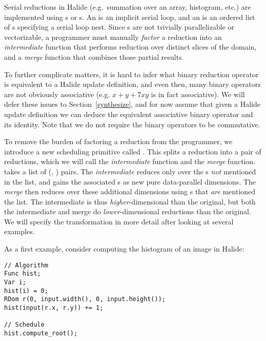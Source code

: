 
Serial reductions in Halide (e.g.\ summation over an array, histogram, etc.) are implemented using s or s. An  is an implicit serial loop, and an  is an ordered list of s specifying a serial loop nest. Since s are not trivially parallelizable or vectorizable, a programmer must manually \emph{factor} a reduction into an \emph{intermediate} function that performs reduction over distinct slices of the domain, and a \emph{merge} function that combines those partial results.

To further complicate matters, it is hard to infer what binary reduction operator is equivalent to a Halide update definition, and even then, many binary operators are not obviously associative (e.g. $x + y + 7xy$ is in fact associative). We will defer these issues to Section~\ref{synthesize}, and for now assume that given a Halide update definition we can deduce the equivalent associative binary operator and its identity. Note that we do not require the binary operators to be commutative.

To remove the burden of factoring a reduction from the programmer, we introduce a new scheduling primitive called . This splits a reduction into a pair of reductions, which we will call the \emph{intermediate} function and the \emph{merge} function.  takes a list of (, ) pairs. The \emph{intermediate} reduces only over the s \emph{not} mentioned in the list, and gains the associated s as new pure data-parallel dimensions. The \emph{merge} then reduces over these additional dimensions using s that \emph{are} mentioned the list. The intermediate is thus \emph{higher}-dimensional than the original, but both the intermediate and merge do \emph{lower}-dimensional reductions than the original. We will specify the transformation in more detail after looking at several examples.

As a first example, consider computing the histogram of an image in Halide:

\begin{lstlisting}
// Algorithm
Func hist;
Var i;
hist(i) = 0;
RDom r(0, input.width(), 0, input.height());
hist(input(r.x, r.y)) += 1;

// Schedule
hist.compute_root();
\end{lstlisting}

